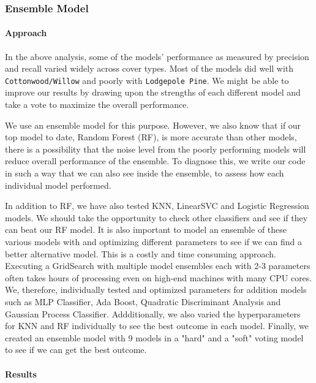 \documentclass[11pt]{article}
\begin{document}
    \subsubsection{Ensemble Model}\label{ensemble-model}

    \paragraph{Approach}\label{approach}

In the above analysis, some of the models' performance as measured by
precision and recall varied widely across cover types. Most of the
models did well with \texttt{Cottonwood/Willow} and poorly with
\texttt{Lodgepole\ Pine}. We might be able to improve our results by
drawing upon the strengths of each different model and take a vote to
maximize the overall performance.

We use an ensemble model for this purpose. However, we also know that if
our top model to date, Random Forest (RF), is more accurate than other
models, there is a possibility that the noise level from the poorly
performing models will reduce overall performance of the ensemble. To
diagnose this, we write our code in such a way that we can also see
inside the ensemble, to assess how each individual model performed.

In addition to RF, we have also tested KNN, LinearSVC and Logistic
Regression models. We should take the opportunity to check other
classifiers and see if they can beat our RF model. It is also important
to model an ensemble of these various models with and optimizing
different parameters to see if we can find a better alternative model.
This is a costly and time consuming approach. Executing a GridSearch
with multiple model ensembles each with 2-3 parameters often takes hours
of processing even on high-end machines with many CPU cores. We,
therefore, individually tested and optimized parameters for addition
models such as MLP Classifier, Ada Boost, Quadratic Discriminant
Analysis and Gaussian Process Classifier. Addditionally, we also varied
the hyperparameters for KNN and RF individually to see the best outcome
in each model. Finally, we created an ensemble model with 9 models in a
"hard" and a "soft" voting model to see if we can get the best outcome.

\paragraph{Results}\label{results}
\end{document}
